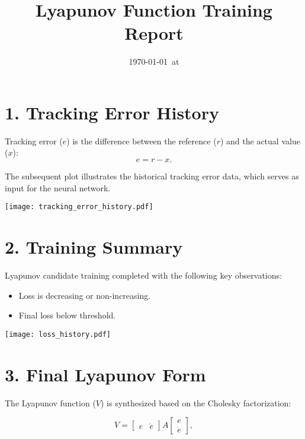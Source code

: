 \documentclass[11pt]{article}
\title{Lyapunov Function Training Report}
\author{}
\date{\today\ at \currenttime}
\begin{document}
\maketitle
\thispagestyle{fancy}

\section*{1. Tracking Error History}
Tracking error ($e$) is the difference between the reference ($r$) and the actual value ($x$):
\begin{equation}
e = r - x.
\end{equation}

\indent The subsequent plot illustrates the historical tracking error data, which serves as input for the neural network.

\begin{center}
\texttt{[image: tracking\_error\_history.pdf]}
\end{center}

\section*{2. Training Summary}
Lyapunov candidate training completed with the following key observations:
\begin{itemize}
  \item  Loss is decreasing or non-increasing.
  \item  Final loss below threshold.
\end{itemize}

\begin{center}
\texttt{[image: loss\_history.pdf]}
\end{center}

\section*{3. Final Lyapunov Form}
The Lyapunov function ($V$) is synthesized based on the Cholesky factorization:

\begin{equation}
V = 
\begin{bmatrix}
e & \dot{e}
\end{bmatrix}
A
\begin{bmatrix}
e \\
\dot{e}
\end{bmatrix},
\label{eq:lyapunov_definition}
\end{equation}
\end{document}
